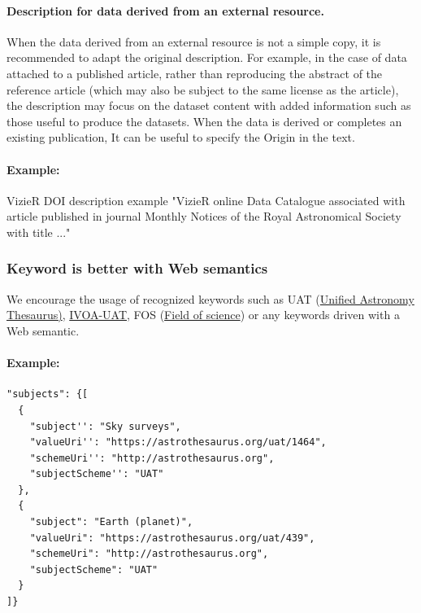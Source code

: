 \documentclass[11pt,a4paper]{ivoa}
\begin{document}
\paragraph{Description for data derived from an external resource.}
When the data derived from an external resource is not a simple copy, it is recommended to\newline
adapt the original description. For example, in the case of data attached to a published article, rather than reproducing the abstract of the reference article (which may also be subject to the same license as the article), the description may focus on the dataset content with added information such as those useful to produce the datasets.\newline
When the data is derived or completes an existing publication, It can be useful to specify the Origin in the text.

\paragraph{Example:} VizieR DOI description example \newline
"VizieR online Data Catalogue associated with article published in journal Monthly Notices of the Royal Astronomical Society with title ..."

\subsubsection{Keyword is better with Web semantics}\hypertarget{keyword-is-better-with-web-semantics}{}\label{sec:keyword-is-better-with-web-semantics}

We encourage the usage of recognized keywords such as UAT (\href{https://astrothesaurus.org/}{Unified Astronomy Thesaurus)}, \href{https://www.ivoa.net/rdf/uat/2024-06-25/uat.html}{IVOA-UAT}, FOS (\href{https://api.openaire.eu/vocabularies/dnet:fos}{Field of science}) or any keywords driven with a Web semantic.\newline

\paragraph{Example:}
\begin{lstlisting}
"subjects": {[
  {
    "subject'': "Sky surveys",
    "valueUri'': "https://astrothesaurus.org/uat/1464",
    "schemeUri'': "http://astrothesaurus.org",
    "subjectScheme'': "UAT"
  },
  {
    "subject": "Earth (planet)",
    "valueUri": "https://astrothesaurus.org/uat/439",
    "schemeUri": "http://astrothesaurus.org", 
    "subjectScheme": "UAT"
  }
]}
\end{lstlisting}
\end{document}
